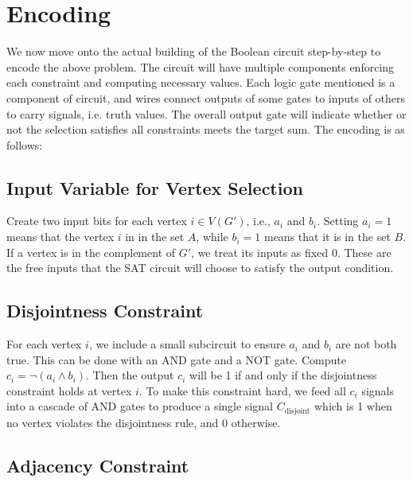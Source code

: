 \documentclass{article}
\begin{document}
\section{Encoding}

We now move onto the actual building of the Boolean circuit step-by-step to encode the above problem. The circuit will have multiple components enforcing each constraint and computing necessary values. Each logic gate mentioned is a component of circuit, and wires connect outputs of some gates to inputs of others to carry signals, i.e. truth values. The overall output gate will indicate whether or not the selection satisfies all constraints meets the target sum. The encoding is as follows:

\subsection{Input Variable for Vertex Selection}

Create two input bits for each vertex $i \in V(G')$, i.e., $a_i$ and $b_i$. Setting $a_i = 1$ means that the vertex $i$ in in the set $A$, while $b_i = 1$ means that it is in the set $B$. If a vertex is in the complement of $G'$, we treat its inputs as fixed 0. These are the free inputs that the SAT circuit will choose to satisfy the output condition.

\subsection{Disjointness Constraint}

For each vertex $i$, we include a small subcircuit to ensure $a_i$ and $b_i$ are not both true. This can be done with an AND gate and a NOT gate. Compute $c_i = \neg(a_i \land b_i)$. Then the output $c_i$ will be 1 if and only if the disjointness constraint holds at vertex $i$. To make this constraint hard, we feed all $c_i$ signals into a cascade of AND gates to produce a single signal $C_{\text{disjoint}}$ which is 1 when no vertex violates the disjointness rule, and 0 otherwise.

\subsection{Adjacency Constraint}
\end{document}

